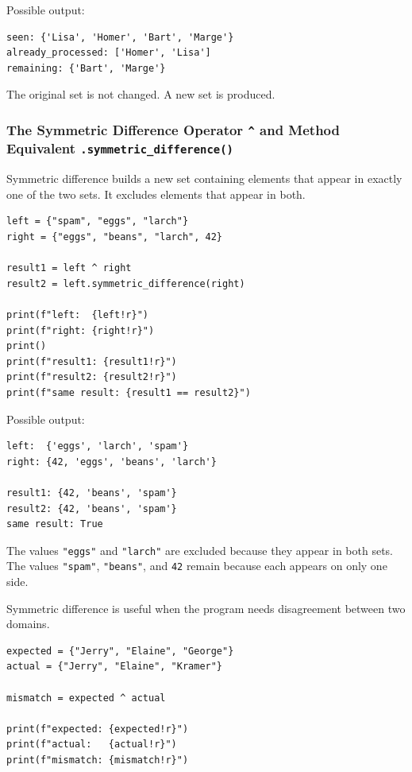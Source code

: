 Possible output:

\begin{verbatim}
seen: {'Lisa', 'Homer', 'Bart', 'Marge'}
already_processed: ['Homer', 'Lisa']
remaining: {'Bart', 'Marge'}
\end{verbatim}

The original set is not changed. A new set is produced.

\subsubsection{The Symmetric Difference Operator \texttt{\textasciicircum{}} and Method Equivalent \texttt{.symmetric\_difference()}}

Symmetric difference builds a new set containing elements that appear in exactly one of the two sets. It excludes elements that appear in both.

\begin{verbatim}
left = {"spam", "eggs", "larch"}
right = {"eggs", "beans", "larch", 42}

result1 = left ^ right
result2 = left.symmetric_difference(right)

print(f"left:  {left!r}")
print(f"right: {right!r}")
print()
print(f"result1: {result1!r}")
print(f"result2: {result2!r}")
print(f"same result: {result1 == result2}")
\end{verbatim}

Possible output:

\begin{verbatim}
left:  {'eggs', 'larch', 'spam'}
right: {42, 'eggs', 'beans', 'larch'}

result1: {42, 'beans', 'spam'}
result2: {42, 'beans', 'spam'}
same result: True
\end{verbatim}

The values \texttt{"eggs"} and \texttt{"larch"} are excluded because they appear in both sets. The values \texttt{"spam"}, \texttt{"beans"}, and \texttt{42} remain because each appears on only one side.

Symmetric difference is useful when the program needs disagreement between two domains.

\begin{verbatim}
expected = {"Jerry", "Elaine", "George"}
actual = {"Jerry", "Elaine", "Kramer"}

mismatch = expected ^ actual

print(f"expected: {expected!r}")
print(f"actual:   {actual!r}")
print(f"mismatch: {mismatch!r}")
\end{verbatim}

